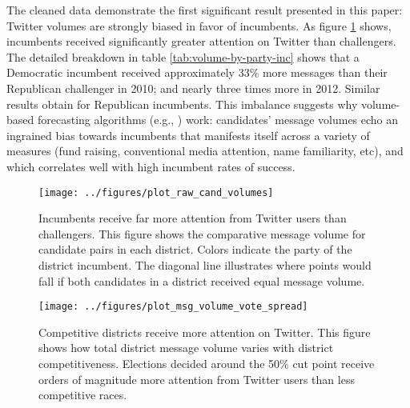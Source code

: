 \documentclass{acm_proc_article-sp}
\begin{document}
The cleaned data demonstrate the first significant result presented in
this paper: Twitter volumes are strongly biased in favor of
incumbents. As figure \ref{fig:cand-msg-volume} shows, incumbents
received significantly greater attention on Twitter than challengers.
The detailed breakdown in table \ref{tab:volume-by-party-inc} shows
that a Democratic incumbent received approximately 33\% more messages
than their Republican challenger in 2010; and nearly three times more
in 2012. Similar results obtain for Republican incumbents. This
imbalance suggests why volume-based forecasting algorithms (e.g.,
\cite{digrazia2013,tumasjan2010election,bermingham2011using}) work:
candidates' message volumes echo an ingrained bias towards incumbents
that manifests itself across a variety of measures (fund raising,
conventional media attention, name familiarity, etc), and which
correlates well with high incumbent rates of success. 


\begin{figure}[ht]
  \centering
  \texttt{[image: ../figures/plot\_raw\_cand\_volumes]}
  \caption{Incumbents receive far more attention from Twitter users
    than challengers. This figure shows the comparative message volume for
    candidate pairs in each district. Colors indicate the party of the
    district incumbent. The diagonal line illustrates where points would fall if both candidates in a district received equal message volume.}
  \label{fig:cand-msg-volume}
\end{figure}

\begin{figure}[ht]
  \centering
  \texttt{[image: ../figures/plot\_msg\_volume\_vote\_spread]}
  \caption{Competitive districts receive more attention on
    Twitter. This figure shows how total district message volume
    varies with district competitiveness. Elections decided around the
  50\% cut point receive orders of magnitude more attention from
  Twitter users than less competitive races.}
  \label{fig:msg-volume-vote-spread}
\end{figure}
\end{document}

